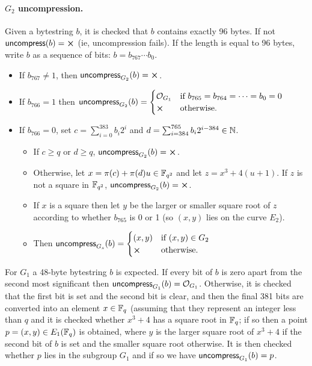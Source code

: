 \paragraph{$G_2$ uncompression.}  Given a bytestring $b$, it is checked that
$b$ contains exactly 96 bytes.  If not $\uncompress(b) = \errorX$ (ie,
uncompression fails).  If the length is equal to 96 bytes, write $b$ as a
sequence of bits: $b = b_{767} \cdots b_0$.
\begin{itemize}
\item If $b_{767} \neq 1$, then $\uncompress_{G_2}(b) = \errorX$.
\item If $b_{766} = 1$ then $\uncompress_{G_2}(b) =
\begin{cases}
\mathcal{O}_{G_1} & \text{if $b_{765} = b_{764} = \cdots = b_0 = 0$}\\
\errorX & \text{otherwise}.
\end{cases}$
\item If $b_{766} = 0$, set $c=\sum_{i=0}^{383}b_i2^i$ and $d=\sum_{i=384}^{765}b_i2^{i-384} \in \mathbb{N}$.
\begin{itemize}
\item If $c \geq q$ or $d \geq q$, $\uncompress_{G_2}(b) = \errorX$.
\item Otherwise, let $x = \pi(c)+\pi(d)u \in \mathbb{F}_{q^2}$ and let $z = x^3+4(u+1)$.
If $z$ is not a square in $\mathbb{F}_{q^2}$, $\uncompress_{G_2}(b) = \errorX$.
\item If $x$ is a square then let $y$ be the larger or smaller square root of $z$ according to
whether $b_{765}$ is 0 or 1 (so $(x,y)$ lies on the curve $E_2$).
\item Then $\uncompress_{G_s}(b) = \begin{cases}
(x,y) & \text{if $(x,y) \in G_2$}\\
\errorX & \text{otherwise}.
\end{cases}$
\end{itemize}
\end{itemize}


For $G_1$ a 48-byte bytestring $b$ is expected. If every bit of $b$ is zero
apart from the second most significant then $\mathsf{uncompress}_{G_1}(b)
= \mathcal{O}_{G_1}$.  Otherwise, it is checked that the first bit is set and
the second bit is clear, and then the final 381 bits are converted into an
element $x\in\mathbb{F}_q$ (assuming that they represent an integer less than $q$ and it
is checked whether $x^3+4$ has a square root in $\mathbb{F}_q$; if so then a point
$p=(x,y) \in E_1(\mathbb{F}_q)$ is obtained, where $y$ is the larger square root of
$x^3+4$ if the second bit of $b$ is set and the smaller square root otherwise.
It is then checked whether $p$ lies in the subgroup $G_1$ and if so we have
$\mathsf{uncompress}_{G_1}(b)=p$.

